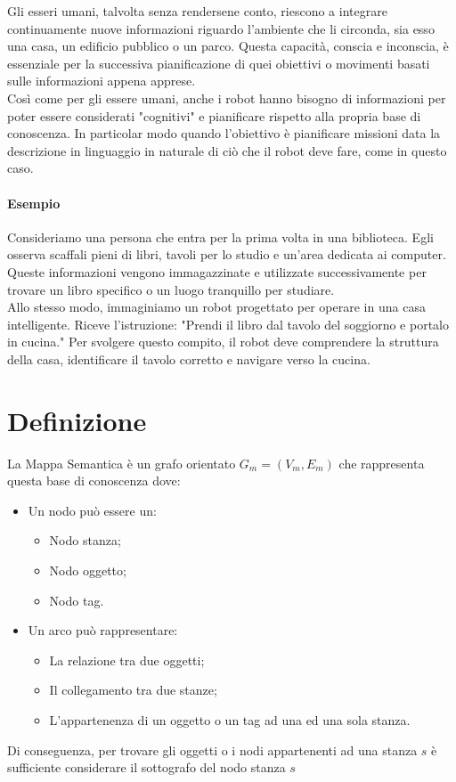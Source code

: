 Gli esseri umani, talvolta senza rendersene conto, riescono a integrare continuamente nuove informazioni riguardo l'ambiente che li circonda, sia esso una casa, un edificio pubblico o un parco. Questa capacità, conscia e inconscia, è essenziale per la successiva pianificazione di quei obiettivi o movimenti basati sulle informazioni appena apprese. \\
Così come per gli essere umani, anche i robot hanno bisogno di informazioni per poter essere considerati "cognitivi" e pianificare rispetto alla propria base di conoscenza. In particolar modo quando l'obiettivo è pianificare missioni data la descrizione in linguaggio in naturale di ciò che il robot deve fare, come in questo caso.

\paragraph*{Esempio}
Consideriamo una persona che entra per la prima volta in una biblioteca. Egli osserva scaffali pieni di libri, tavoli per lo studio e un'area dedicata ai computer. Queste informazioni vengono immagazzinate e utilizzate successivamente per trovare un libro specifico o un luogo tranquillo per studiare.\\
Allo stesso modo, immaginiamo un robot progettato per operare in una casa intelligente. Riceve l'istruzione: "Prendi il libro dal tavolo del soggiorno e portalo in cucina." Per svolgere questo compito, il robot deve comprendere la struttura della casa, identificare il tavolo corretto e navigare verso la cucina.

\section{Definizione}
La Mappa Semantica è un grafo orientato $G_m = (V_m, E_m)$ che rappresenta questa base di conoscenza dove:
\begin{itemize}
  \item Un nodo può essere un:
  \begin{itemize}
    \item Nodo stanza;
    \item Nodo oggetto;
    \item Nodo tag.
  \end{itemize}
  \item Un arco può rappresentare:
  \begin{itemize}
    \item La relazione tra due oggetti;
    \item Il collegamento tra due stanze;
    \item L'appartenenza di un oggetto o un tag ad una ed una sola stanza.
  \end{itemize}
\end{itemize}
Di conseguenza, per trovare gli oggetti o i nodi appartenenti ad una stanza $s$ è sufficiente considerare il sottografo del nodo stanza $s$

